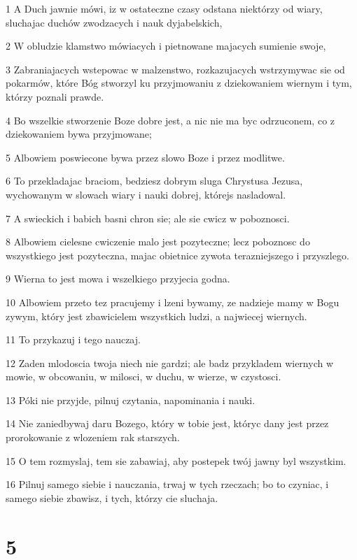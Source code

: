 \par 1 A Duch jawnie mówi, iz w ostateczne czasy odstana niektórzy od wiary, sluchajac duchów zwodzacych i nauk dyjabelskich,
\par 2 W obludzie klamstwo mówiacych i pietnowane majacych sumienie swoje,
\par 3 Zabraniajacych wstepowac w malzenstwo, rozkazujacych wstrzymywac sie od pokarmów, które Bóg stworzyl ku przyjmowaniu z dziekowaniem wiernym i tym, którzy poznali prawde.
\par 4 Bo wszelkie stworzenie Boze dobre jest, a nic nie ma byc odrzuconem, co z dziekowaniem bywa przyjmowane;
\par 5 Albowiem poswiecone bywa przez slowo Boze i przez modlitwe.
\par 6 To przekladajac braciom, bedziesz dobrym sluga Chrystusa Jezusa, wychowanym w slowach wiary i nauki dobrej, którejs nasladowal.
\par 7 A swieckich i babich basni chron sie; ale sie cwicz w poboznosci.
\par 8 Albowiem cielesne cwiczenie malo jest pozyteczne; lecz poboznosc do wszystkiego jest pozyteczna, majac obietnice zywota terazniejszego i przyszlego.
\par 9 Wierna to jest mowa i wszelkiego przyjecia godna.
\par 10 Albowiem przeto tez pracujemy i lzeni bywamy, ze nadzieje mamy w Bogu zywym, który jest zbawicielem wszystkich ludzi, a najwiecej wiernych.
\par 11 To przykazuj i tego nauczaj.
\par 12 Zaden mlodoscia twoja niech nie gardzi; ale badz przykladem wiernych w mowie, w obcowaniu, w milosci, w duchu, w wierze, w czystosci.
\par 13 Póki nie przyjde, pilnuj czytania, napominania i nauki.
\par 14 Nie zaniedbywaj daru Bozego, który w tobie jest, któryc dany jest przez prorokowanie z wlozeniem rak starszych.
\par 15 O tem rozmyslaj, tem sie zabawiaj, aby postepek twój jawny byl wszystkim.
\par 16 Pilnuj samego siebie i nauczania, trwaj w tych rzeczach; bo to czyniac, i samego siebie zbawisz, i tych, którzy cie sluchaja.

\chapter{5}

